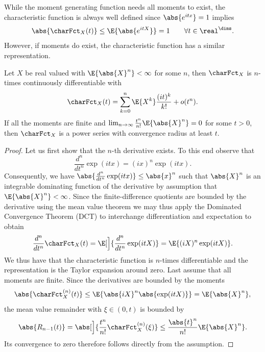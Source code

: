 While the moment generating function needs all moments to exist, the
characteristic function is always well defined since \(\abs{e^{itx}} =1\)
implies
\begin{equation}
    \label{eq: bound on characteristic function}    
    \abs{\charFct_X(t)} \le \E{\abs{e^{itX}}} = 1
    \qquad \forall t\in \real^\dims.
\end{equation}
However, if moments do exist, the characteristic function has a similar
representation.

\begin{lemma}
    \label{lem: characteristic function representation}
    Let \(X\) be real valued with \(\E{\abs{X}^n} < \infty\) for some
    \(n\), then \(\charFct_X\) is \(n\)-times continuously differentiable
    with
    \[
        \charFct_X(t) = \sum_{k=0}^n \E{X^k}\frac{(it)^k}{k!} + o(t^n).
    \]
    If all the moments are finite and \(\lim_{n\to \infty}
    \frac{t^n}{n!}\E{\abs{X}^n} =0\) for some \(t>0\), then
    \(\charFct_X\) is a power series with convergence radius at least \(t\).
\end{lemma}
\begin{proof}
    Let us first show that the \(n\)-th derivative exists. To this end
    observe that
    \[
        \frac{d^n}{dt^n} \exp(i t x) = (ix)^n \exp(i t x).
    \]
    Consequently, we have \(\abs{\frac{d^n}{dt^n} \exp(i t x)} \le \abs{x}^n\) such that
    \(\abs{X}^n\) is an integrable dominating function of the derivative
    by assumption that \(\E{\abs{X}^n} < \infty\). Since the
    finite-difference quotients are bounded by the derivative using the mean value
    theorem we may thus apply the Dominated Convergence Theorem (DCT) to
    interchange differentiation and expectation to obtain
    \[
        \frac{d^n}{dt^n} \charFct_X(t)
        = \E[\Big]{\frac{d^n}{dt^n} \exp(i t X)}
        = \E{(iX)^n \exp(i t X)}.
    \]
    We thus have that the characteristic function is \(n\)-times differentiable
    and the representation is the Taylor expansion around zero.
    Last assume that all moments are finite. Since the derivatives are bounded
    by the moments
    \[
        \abs{\charFct_X^{(n)}(t)} \le \E{\abs{iX}^n \abs{\exp(i t X)}} = \E{\abs{X}^n},
    \]
    the mean value remainder with \(\xi \in (0,t)\) is bounded by
    \[
        \abs{R_{n-1}(t)} = \abs[\Big]{\frac{t^{n}}{n!} \charFct_X^{(n)}(\xi)}
        \le \frac{\abs{t}^{n}}{n!} \E{\abs{X}^{n}}.
    \]
    Its convergence to zero therefore follows directly from the assumption.
\end{proof}

